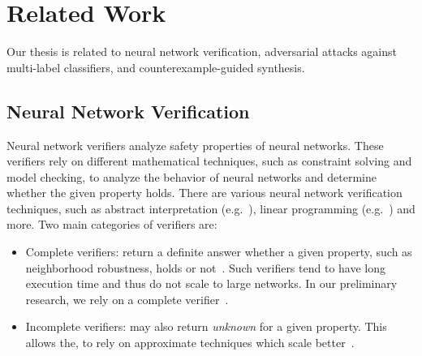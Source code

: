 
\section{Related Work}
Our thesis is related to neural network verification, adversarial attacks against multi-label classifiers, and counterexample-guided synthesis.

\subsection{Neural Network Verification}\label{subsec:verifiers}
Neural network verifiers analyze safety properties of neural networks.
These verifiers rely on different mathematical techniques, such as constraint solving and model checking, to analyze the behavior of neural networks and determine whether the given property holds.
There are various neural network verification techniques, such as abstract interpretation (e.g.~\cite{ABSTRACTINTER, INCOMPLETE1}), linear programming (e.g.~\cite{MIPVERIFY}) and more.
Two main categories of verifiers are:
\begin{itemize}
    \item Complete verifiers: return a definite answer whether a given property, such as neighborhood robustness, holds or not~\cite{MIPVERIFY, COMPLETE}. Such verifiers tend to have long execution time and thus do not scale to large networks.
        In our preliminary research, we rely on a complete verifier~\cite{MIPVERIFY}.
    \item Incomplete verifiers: may also return \emph{unknown} for a given property. This allows the, to rely on approximate techniques which scale better~\cite{INCOMPLETE1, INCOMPLETE2}.
\end{itemize}

